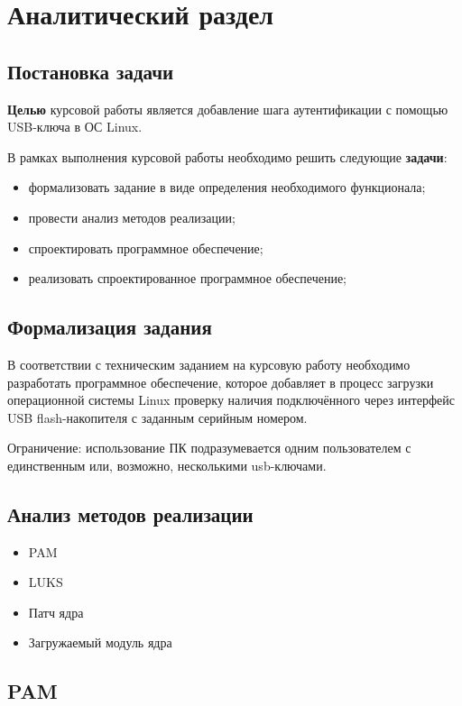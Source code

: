 \chapter{Аналитический раздел}

\section{Постановка задачи}

\textbf{Целью} курсовой работы является добавление шага аутентификации с помощью USB-ключа в ОС Linux.

В рамках выполнения курсовой работы необходимо решить следующие \textbf{задачи}:
\begin{itemize}
	\item формализовать задание в виде определения необходимого функционала;
	\item провести анализ методов реализации;
	\item спроектировать программное обеспечение;
	\item реализовать спроектированное программное обеспечение;
\end{itemize}

\section{Формализация задания}

В соответствии с техническим заданием на курсовую работу необходимо разработать программное обеспечение, которое добавляет в процесс загрузки операционной системы Linux проверку наличия подключённого через интерфейс USB flash-накопителя с заданным серийным номером.

Ограничение: использование ПК подразумевается одним пользователем с единственным или, возможно, несколькими usb-ключами.

\section{Анализ методов реализации}

\begin{itemize}
	\item PAM
	\item LUKS
	\item Патч ядра
	\item Загружаемый модуль ядра
\end{itemize}

\section{PAM}

